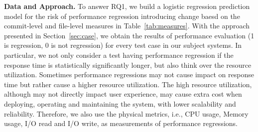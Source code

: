 

 \textbf{Data and Approach.}
To answer RQ1, we build a logistic regression prediction model for the risk of performance regression introducing change baesd on the commit-level and file-level measures in Table~\ref{tab:measures}. With the approach presented in Section~\ref{sec:case}, we obtain the results of performance evaluation (1 is regression, 0 is not regression) for every test case in our subject systems. In particular, we not only consider a test having performance regression if the response time is statistically significantly longer, but also think over the resource utilization. Sometimes performance regressions may not cause impact on response time but rather cause a higher resource utilization. The high resource utilization, although may not directly impact user experience, may cause extra cost when deploying, operating and maintaining the system, with lower scalability and reliability. 
Therefore, we also use the physical metrics, i.e., CPU usage, Memory usage, I/O read and I/O write, as measurements of performance regressions. 

